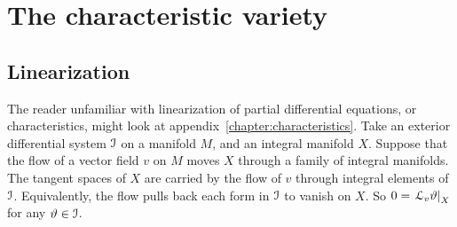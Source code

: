 \chapter{The characteristic variety}
\section{Linearization}\label{section:linearization}
The reader unfamiliar with linearization of partial differential equations, or characteristics, might look at appendix~\ref{chapter:characteristics}.
Take an exterior differential system \(\mathcal{I}\) on a manifold \(M\), and an integral manifold \(X\).
Suppose that the flow of a vector field \(v\) on \(M\) moves \(X\) through a family of integral manifolds.
The tangent spaces of \(X\) are carried by the flow of \(v\) through integral elements of \(\mathcal{I}\).
Equivalently, the flow pulls back each form in \(\mathcal{I}\) to vanish on \(X\).
So \(0=\left.\EuScript L_v \vartheta\right|_X\) for any \(\vartheta \in \mathcal{I}\).

